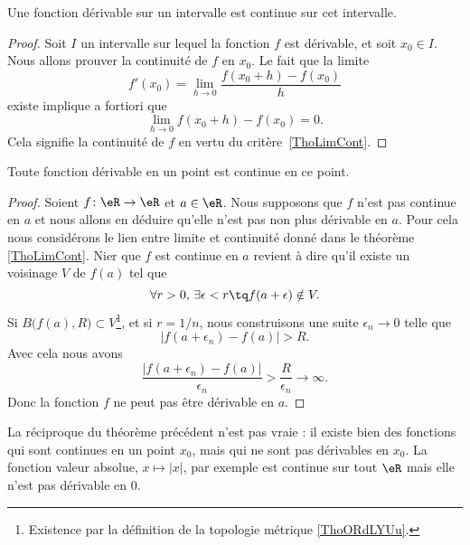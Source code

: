 \begin{proposition} \label{PropSFyxOWF}
	Une fonction dérivable sur un intervalle est continue sur cet intervalle.
\end{proposition}

\begin{proof}
	Soit \( I\) un intervalle sur lequel la fonction \( f\) est dérivable, et soit \( x_0\in I\). Nous allons prouver la continuité de \( f\) en \( x_0\). Le fait que la limite
	\begin{equation}
		f'(x_0)=\lim_{h\to 0} \frac{ f(x_0+h)-f(x_0) }{ h }
	\end{equation}
	existe implique a fortiori que
	\begin{equation}
		\lim_{h\to 0} f(x_0+h)-f(x_0)=0.
	\end{equation}
	Cela signifie la continuité de \( f\) en vertu du critère~\ref{ThoLimCont}.
\end{proof}

\begin{theorem} \label{THOooFFOZooCYGets}
	Toute fonction dérivable en un point est continue en ce point.
\end{theorem}

\begin{proof}
	Soient \( f\colon \eR\to \eR\) et \( a\in \eR\). Nous supposons que \( f\) n'est pas continue en \( a\) et nous allons en déduire qu'elle n'est pas non plus dérivable en \( a\). Pour cela nous considérons le lien entre limite et continuité donné dans le théorème \ref{ThoLimCont}. Nier que \( f\) est continue en \( a\) revient à dire qu'il existe un voisinage \( V\) de \( f(a)\) tel que
	\begin{equation}
		\forall r>0,\,\exists \epsilon<r \tq f(a+\epsilon)\notin V.
	\end{equation}
	Si \( B\big( f(a),R \big)\subset V\)\footnote{Existence par la définition de la topologie métrique \ref{ThoORdLYUu}.}, et si \( r=1/n\), nous construisons une suite \( \epsilon_n\to 0\) telle que
	\begin{equation}
		| f(a+\epsilon_n)-f(a) |>R.
	\end{equation}
	Avec cela nous avons
	\begin{equation}
		\frac{ | f(a+\epsilon_n)-f(a) | }{ \epsilon_n }>\frac{ R }{ \epsilon_n }\to \infty.
	\end{equation}
	Donc la fonction \( f\) ne peut pas être dérivable en \( a\).
\end{proof}

\begin{remark}
	La réciproque du théorème précédent n'est pas vraie : il existe bien des fonctions qui sont continues en un point \( x_0\), mais qui ne sont pas dérivables en \( x_0\). La fonction valeur absolue, \( x\mapsto |x|\), par exemple est continue sur tout \( \eR\) mais elle n'est pas dérivable en \( 0\).
\end{remark}

